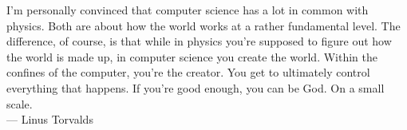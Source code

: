 
\cleardoublepage
{}
\thispagestyle{empty}

\vspace*{3cm}

\begin{center}
I'm personally convinced that computer science has a lot in common with physics. Both are about how the world works at a rather fundamental level. The difference, of course, is that while in physics you're supposed to figure out how the world is made up, in computer science you create the world. Within the confines of the computer, you're the creator. You get to ultimately control everything that happens. If you're good enough, you can be God. On a small scale. \\ \medskip
--- Linus Torvalds
\end{center}
